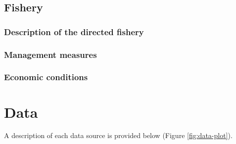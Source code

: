 \documentclass[11pt,
  english,
  a4paper,
]{article}
\begin{document}

\hypertarget{fishery}{%
\subsection{Fishery}\label{fishery}}

\leavevmode\tagmcend\tagstructend


\hypertarget{description-of-the-directed-fishery}{%
\subsubsection{Description of the directed fishery}\label{description-of-the-directed-fishery}}

\leavevmode\tagmcend\tagstructend


\hypertarget{management-measures}{%
\subsubsection{Management measures}\label{management-measures}}

\leavevmode\tagmcend\tagstructend


\hypertarget{economic-conditions}{%
\subsubsection{Economic conditions}\label{economic-conditions}}

\leavevmode\tagmcend\tagstructend


\hypertarget{data}{%
\section{Data}\label{data}}

\leavevmode\tagmcend\tagstructend


A description of each data source is provided below (Figure \ref{fig:data-plot}).

\leavevmode\tagmcend\tagstructend\par

\end{document}
